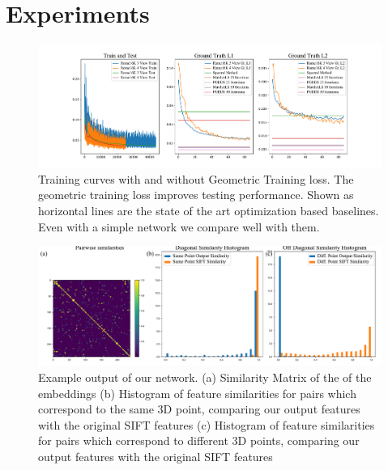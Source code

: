 \documentclass[10pt,twocolumn,letterpaper]{article}
\begin{document}
\section{Experiments}

\begin{figure}
\begin{center}
  \includegraphics[width=0.8\linewidth]{figures-TrainingCurves.pdf}
  \end{center}
    \caption{
      Training curves with and without Geometric Training loss.
      The geometric training loss improves testing performance.
      Shown as horizontal lines are the state of the art optimization based baselines.
      Even with a simple network we compare well with them.
    }
  \label{fig:short}
\end{figure}


\begin{figure}
\begin{center}
  \includegraphics[width=0.8\linewidth]{figures-ExampleOutput.pdf}
  \end{center}
     \caption{Example output of our network. (a) Similarity Matrix of the of the embeddings (b) Histogram of feature similarities for pairs which correspond to the same 3D point, comparing our output features with the original SIFT features (c) Histogram of feature similarities for pairs which correspond to different 3D points, comparing our output features with the original SIFT features}
  \label{fig:short}
\end{figure}
\end{document}
